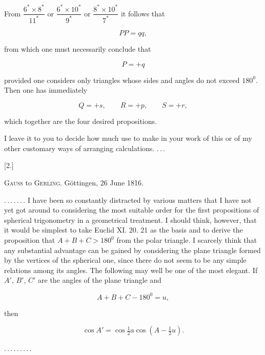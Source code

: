 From $\dfrac{6^\ast\times 8^\ast}{11^\ast}$ or $\dfrac{6^\ast\times 10^\ast}{9^\ast}$ or $\dfrac{8^\ast\times 10^\ast}{7^\ast}$ it follows that

\[
PP=qq,
\]

from which one must necessarily conclude that

\[
P=+q
\]

provided one considers only triangles whose sides and angles do not exceed $180^0$. Then one has immediately

\[
Q=+s,\qquad R=+p,\qquad S=+r,
\]

which together are the four desired propositions.

I leave it to you to decide how much use to make in your work of this or of my other customary ways of arranging calculations. \mbox{.\,.\,.}

\medskip

\begin{center}
[2.]

\textsc{Gauss} to \textsc{Gerling}. Göttingen, 26 June 1816.
\end{center}

\mbox{.\,.\,.\,.\,.\,.\,.} I have been so constantly distracted by various matters that I have not yet got around to considering the most suitable order for the first propositions of spherical trigonometry in a geometrical treatment. I should think, however, that it would be simplest to take Euclid XI. 20. 21 as the basis and to derive the proposition that $A+B+C>180^0$ from the polar triangle. I scarcely think that any substantial advantage can be gained by considering the plane triangle formed by the vertices of the spherical one, since there do not seem to be any  simple relations among its angles. The following may well be one of the most elegant. If $A'$, $B'$, $C'$ are the angles of the plane triangle and

\[
A+B+C-180^0=u,
\]

then

\[
\cos A'=\cos\tfrac{1}{2}a\cos(A-\tfrac{1}{2}u).
\]

\mbox{.\,.\,.\,.\,.\,.\,.\,.\,.}
